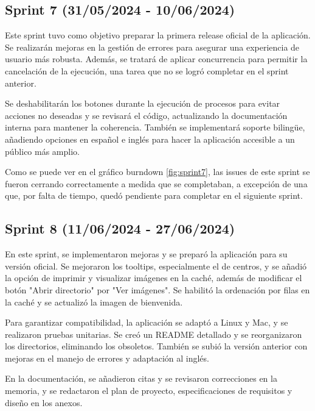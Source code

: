 \subsection{Sprint 7 (31/05/2024 - 10/06/2024)}\label{sprint-7}

Este sprint tuvo como objetivo preparar la primera release oficial de la aplicación. Se realizarán mejoras en la gestión de errores para asegurar una experiencia de usuario más robusta. Además, se tratará de aplicar concurrencia para permitir la cancelación de la ejecución, una tarea que no se logró completar en el sprint anterior.

Se deshabilitarán los botones durante la ejecución de procesos para evitar acciones no deseadas y se revisará el código, actualizando la documentación interna para mantener la coherencia. También se implementará soporte bilingüe, añadiendo opciones en español e inglés para hacer la aplicación accesible a un público más amplio.


Como se puede ver en el gráfico burndown \ref{fig:sprint7}, las issues de este sprint se fueron cerrando correctamente a medida que se completaban, a excepción de una que, por falta de tiempo, quedó pendiente para completar en el siguiente sprint.


\subsection{Sprint 8 (11/06/2024 - 27/06/2024)}\label{sprint-8}

En este sprint, se implementaron mejoras y se preparó la aplicación para su versión oficial. Se mejoraron los tooltips, especialmente el de centros, y se añadió la opción de imprimir y visualizar imágenes en la caché, además de modificar el botón "Abrir directorio" por "Ver imágenes". Se habilitó la ordenación por filas en la caché y se actualizó la imagen de bienvenida.

Para garantizar compatibilidad, la aplicación se adaptó a Linux y Mac, y se realizaron pruebas unitarias. Se creó un README detallado y se reorganizaron los directorios, eliminando los obsoletos. También se subió la versión anterior con mejoras en el manejo de errores y adaptación al inglés.

En la documentación, se añadieron citas y se revisaron correcciones en la memoria, y se redactaron el plan de proyecto, especificaciones de requisitos y diseño en los anexos.

